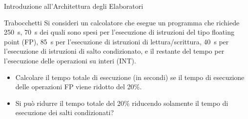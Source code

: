 \documentclass[11pt]{article}
\begin{document}
\begin{quiz}{Introduzione all'Architettura degli Elaboratori}
\begin{cloze}[points=1,shuffle=true]{Trabocchetti}
Si consideri un calcolatore che esegue un programma che richiede 250~s, 70~s dei quali sono spesi per l’esecuzione di istruzioni del tipo floating point (FP), 85~s per l’esecuzione di istruzioni di lettura/scrittura, 40~s per l’esecuzione di istruzioni di salto condizionato, e il restante del tempo per l'esecuzione delle operazioni su interi (INT).

\begin{itemize}
\item Calcolare il tempo totale di esecuzione (in secondi) se il tempo di esecuzione delle operazioni FP viene ridotto del 20\%. 
\item Si può ridurre il tempo totale del 20\% riducendo solamente il tempo di esecuzione dei salti condizionati?
\end{itemize}
\end{cloze}

\end{quiz}
\end{document}
